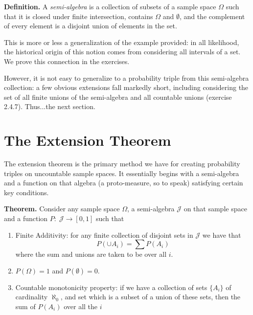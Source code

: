 \documentclass{article}
\begin{document}
\medskip

\noindent \textbf{Definition.} A \emph{semi-algebra} is a collection of subsets of a sample space $\Omega$ such that  it is closed under finite intersection, contains $\Omega$ and $\emptyset$, and the complement of every element is a disjoint union of elements in the set.

\medskip

This is more or less a generalization of the example provided: in all likelihood, the historical origin of this notion comes from considering all intervals of a set. We prove this connection in the exercises. 

However, it is not easy to generalize to a probability triple from this semi-algebra collection: a few obvious extensions fall markedly short, including considering the set of all finite unions of the semi-algebra and all countable unions (exercise 2.4.7). Thus...the next section. 

\section{The Extension Theorem}

The extension theorem is the primary method we have for creating probability triples on uncountable sample spaces. It essentially begins with a semi-algebra and a function on that algebra (a proto-measure, so to speak) satisfying certain key conditions. 

\medskip

\noindent \textbf{Theorem.} Consider any sample space $\Omega$, a semi-algebra $\mathcal{J}$ on that sample space and a function $P: \; \mathcal{J} \to [0,1]$ such that 

\begin{enumerate}

\item Finite Additivity: for any finite collection of disjoint sets in $\mathcal{J}$ we have that \[P(\cup A_i) = \sum P(A_i) \] where the sum and unions are taken to be over all $i$. 

\item $P(\Omega) = 1$ and $P(\emptyset) = 0$.

\item Countable monotonicity property: if we have a collection of sets $\{A_i\}$ of cardinality $\aleph_0$, and set which is a subset of a union of these sets, then the sum of $P(A_i)$ over all the $i$ 

\end{enumerate} 
\end{document}
